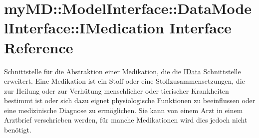 \hypertarget{interfacemy_m_d_1_1_model_interface_1_1_data_model_interface_1_1_i_medication}{
\section{my\-MD::Model\-Interface::Data\-Model\-Interface::IMedication Interface Reference}
\label{d2/dce/interfacemy_m_d_1_1_model_interface_1_1_data_model_interface_1_1_i_medication}
}
Schnittstelle f\"{u}r die Abstraktion einer Medikation, die die \hyperlink{interfacemy_m_d_1_1_model_interface_1_1_data_model_interface_1_1_i_data}{IData} Schnittstelle erweitert. Eine Medikation ist ein Stoff oder eine Stoffzusammensetzungen, die zur Heilung oder zur Verh\"{u}tung menschlicher oder tierischer Krankheiten bestimmt ist oder sich dazu eignet physiologische Funktionen zu beeinflussen oder eine medizinische Diagnose zu erm\"{o}glichen. Sie kann von einem Arzt in einem Arztbrief verschrieben werden, f\"{u}r manche Medikationen wird dies jedoch nicht ben\"{o}tigt.  


